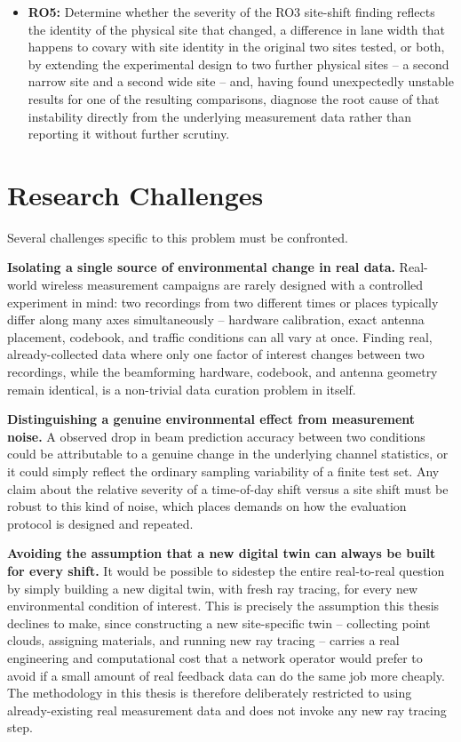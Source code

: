 \documentclass{iutbscthesis}
\begin{document}
\begin{itemize}
    \item \textbf{RO5:} Determine whether the severity of the RO3 site-shift finding reflects the identity of the physical site that changed, a difference in lane width that happens to covary with site identity in the original two sites tested, or both, by extending the experimental design to two further physical sites -- a second narrow site and a second wide site -- and, having found unexpectedly unstable results for one of the resulting comparisons, diagnose the root cause of that instability directly from the underlying measurement data rather than reporting it without further scrutiny.
\end{itemize}

\section{Research Challenges}

Several challenges specific to this problem must be confronted.

\textbf{Isolating a single source of environmental change in real data.} Real-world wireless measurement campaigns are rarely designed with a controlled experiment in mind: two recordings from two different times or places typically differ along many axes simultaneously -- hardware calibration, exact antenna placement, codebook, and traffic conditions can all vary at once. Finding real, already-collected data where only one factor of interest changes between two recordings, while the beamforming hardware, codebook, and antenna geometry remain identical, is a non-trivial data curation problem in itself.

\textbf{Distinguishing a genuine environmental effect from measurement noise.} A observed drop in beam prediction accuracy between two conditions could be attributable to a genuine change in the underlying channel statistics, or it could simply reflect the ordinary sampling variability of a finite test set. Any claim about the relative severity of a time-of-day shift versus a site shift must be robust to this kind of noise, which places demands on how the evaluation protocol is designed and repeated.

\textbf{Avoiding the assumption that a new digital twin can always be built for every shift.} It would be possible to sidestep the entire real-to-real question by simply building a new digital twin, with fresh ray tracing, for every new environmental condition of interest. This is precisely the assumption this thesis declines to make, since constructing a new site-specific twin -- collecting point clouds, assigning materials, and running new ray tracing -- carries a real engineering and computational cost that a network operator would prefer to avoid if a small amount of real feedback data can do the same job more cheaply. The methodology in this thesis is therefore deliberately restricted to using already-existing real measurement data and does not invoke any new ray tracing step.
\end{document}
